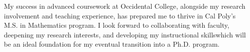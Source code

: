 \documentclass[11pt]{article}
\begin{document}
My success in advanced coursework at Occidental College, alongside my research involvement and teaching experience, has prepared me to thrive in Cal Poly's M.S. in Mathematics program. I look forward to collaborating with faculty, deepening my research interests, and developing my instructional skills\textemdash which will be an ideal foundation for my eventual transition into a Ph.D. program.
\end{document}
